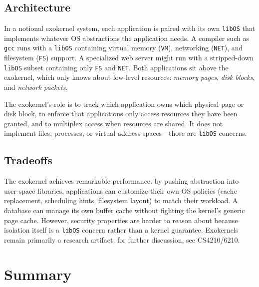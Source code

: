 \documentclass[11pt]{article}
\begin{document}
\subsection{Architecture}

In a notional exokernel system, each application is paired with its own \texttt{libOS} that implements whatever OS abstractions the application needs. A compiler such as \texttt{gcc} runs with a \texttt{libOS} containing virtual memory (\texttt{VM}), networking (\texttt{NET}), and filesystem (\texttt{FS}) support. A specialized web server might run with a stripped-down \texttt{libOS} subset containing only \texttt{FS} and \texttt{NET}. Both applications sit above the exokernel, which only knows about low-level resources: \emph{memory pages}, \emph{disk blocks}, and \emph{network packets}.

The exokernel's role is to track which application owns which physical page or disk block, to enforce that applications only access resources they have been granted, and to multiplex access when resources are shared. It does not implement files, processes, or virtual address spaces---those are \texttt{libOS} concerns.

\subsection{Tradeoffs}

The exokernel achieves remarkable performance: by pushing abstraction into user-space libraries, applications can customize their own OS policies (cache replacement, scheduling hints, filesystem layout) to match their workload. A database can manage its own buffer cache without fighting the kernel's generic page cache. However, security properties are harder to reason about because isolation itself is a \texttt{libOS} concern rather than a kernel guarantee. Exokernels remain primarily a research artifact; for further discussion, see CS4210/6210.

\section{Summary}
\end{document}
